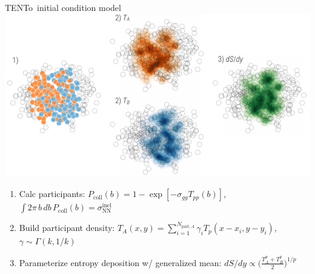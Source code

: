 \documentclass[xcolor=dvipsnames]{beamer}
\newcommand{\trento}{T\raisebox{-0.3ex}{R}ENTo}
\begin{document}
\begin{frame}{\trento\ initial condition model }
    \vspace{.6 cm}
    \includegraphics{schematic} \\
    \begin{enumerate}
        \scriptsize
        \item Calc participants: $P_\text{coll}(b) = 1 - \exp[-\sigma_{gg} T_{pp}(b)]$, \quad $\int 2 \pi\, b\, db\, P_\text{coll}(b) = \sigma_\text{NN}^\text{inel}$ \\ \vspace{0.1 cm}
        \item Build participant density: $T_A(x,y) = \sum\limits_{i=1}^{N_{\text{part},A}} \gamma_i T_p(x-x_i, y-y_i)$, \quad $\gamma \sim \Gamma(k, 1/k)$ \\
        \item Parameterize entropy deposition w/ generalized mean: $dS/dy \propto \bigg(\frac{T_A^p + T_B^p}{2} \bigg)^{1/p}$
    \end{enumerate}
\end{frame}

\end{document}
